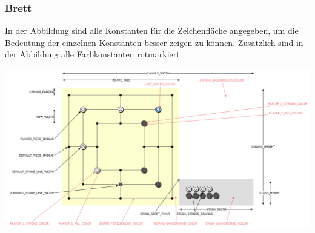 \documentclass[11pt]{article}
\begin{document}
    \hypertarget{brett}{%
\subsubsection{Brett}\label{brett}}

In der Abbildung sind alle Konstanten für die Zeichenfläche angegeben,
um die Bedeutung der einzelnen Konstanten besser zeigen zu können.
Zusätzlich sind in der Abbildung alle Farbkonstanten rotmarkiert.

\includegraphics{../images/nmm-constants.png}
\end{document}
